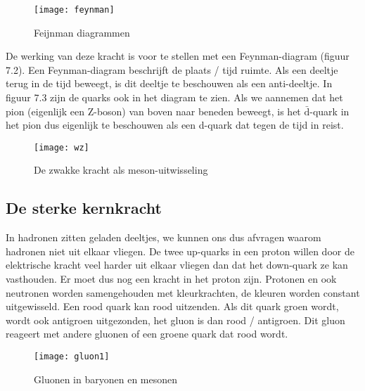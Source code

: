 \begin{figure}
\noindent \begin{centering}
\texttt{[image: feynman]}
\par\end{centering}

\caption{Feijnman diagrammen}
\end{figure}


De werking van deze kracht is voor te stellen met een Feynman-diagram
(figuur 7.2). Een Feynman-diagram beschrijft de plaats / tijd ruimte.
Als een deeltje terug in de tijd beweegt, is dit deeltje te beschouwen
als een anti-deeltje. In figuur 7.3 zijn de quarks ook in het diagram
te zien. Als we aannemen dat het pion (eigenlijk een Z-boson) van
boven naar beneden beweegt, is het $\bar{\mathrm{d}}$-quark in het
pion dus eigenlijk te beschouwen als een d-quark dat tegen de tijd
in reist. 

\begin{figure}[h]
\noindent \begin{centering}
\texttt{[image: wz]}
\par\end{centering}

\caption{De zwakke kracht als meson-uitwisseling}
\end{figure}



\subsection{De sterke kernkracht}

In hadronen zitten geladen deeltjes, we kunnen ons dus afvragen waarom
hadronen niet uit elkaar vliegen. De twee up-quarks in een proton
willen door de elektrische kracht veel harder uit elkaar vliegen dan
dat het down-quark ze kan vasthouden. Er moet dus nog een kracht in
het proton zijn. Protonen en ook neutronen worden samengehouden met
kleurkrachten, de kleuren worden constant uitgewisseld. Een rood quark
kan rood uitzenden. Als dit quark groen wordt, wordt ook antigroen
uit\-gezonden, het gluon is dan rood / antigroen. Dit gluon reageert
met andere gluonen of een groene quark dat rood wordt.

\begin{figure}[H]
\noindent \begin{centering}
\texttt{[image: gluon1]}
\par\end{centering}

\caption{Gluonen in baryonen en mesonen}
\end{figure}


